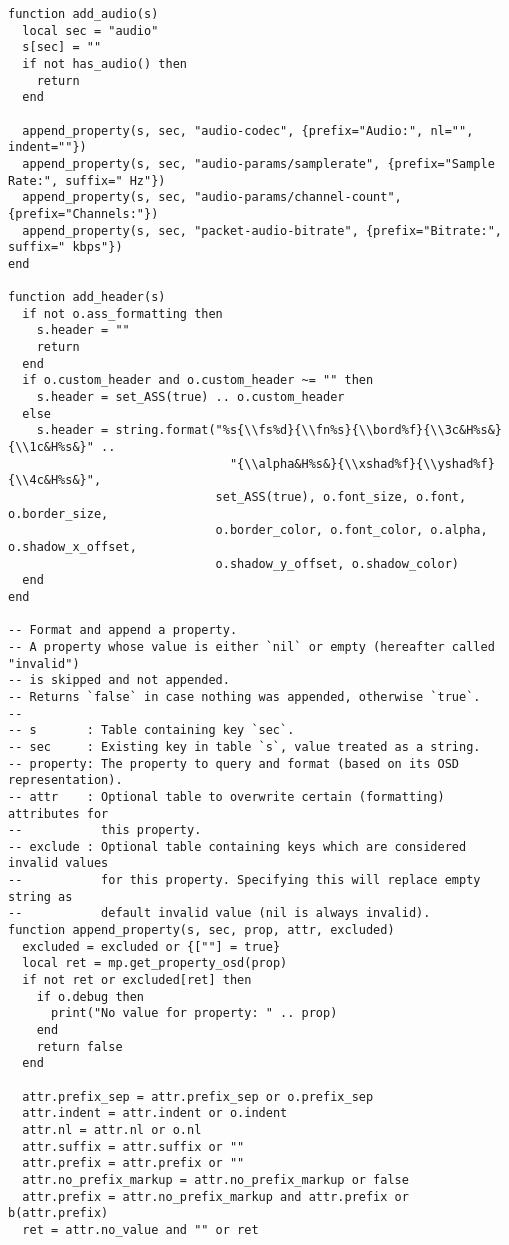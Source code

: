 \documentclass[11pt]{article}
\begin{document}
\begin{lstlisting}
function add_audio(s)
  local sec = "audio"
  s[sec] = ""
  if not has_audio() then
    return
  end

  append_property(s, sec, "audio-codec", {prefix="Audio:", nl="", indent=""})
  append_property(s, sec, "audio-params/samplerate", {prefix="Sample Rate:", suffix=" Hz"})
  append_property(s, sec, "audio-params/channel-count", {prefix="Channels:"})
  append_property(s, sec, "packet-audio-bitrate", {prefix="Bitrate:", suffix=" kbps"})
end

function add_header(s)
  if not o.ass_formatting then
    s.header = ""
    return
  end
  if o.custom_header and o.custom_header ~= "" then
    s.header = set_ASS(true) .. o.custom_header
  else
    s.header = string.format("%s{\\fs%d}{\\fn%s}{\\bord%f}{\\3c&H%s&}{\\1c&H%s&}" ..
                               "{\\alpha&H%s&}{\\xshad%f}{\\yshad%f}{\\4c&H%s&}",
                             set_ASS(true), o.font_size, o.font, o.border_size,
                             o.border_color, o.font_color, o.alpha, o.shadow_x_offset,
                             o.shadow_y_offset, o.shadow_color)
  end
end

-- Format and append a property.
-- A property whose value is either `nil` or empty (hereafter called "invalid")
-- is skipped and not appended.
-- Returns `false` in case nothing was appended, otherwise `true`.
--
-- s       : Table containing key `sec`.
-- sec     : Existing key in table `s`, value treated as a string.
-- property: The property to query and format (based on its OSD representation).
-- attr    : Optional table to overwrite certain (formatting) attributes for
--           this property.
-- exclude : Optional table containing keys which are considered invalid values
--           for this property. Specifying this will replace empty string as
--           default invalid value (nil is always invalid).
function append_property(s, sec, prop, attr, excluded)
  excluded = excluded or {[""] = true}
  local ret = mp.get_property_osd(prop)
  if not ret or excluded[ret] then
    if o.debug then
      print("No value for property: " .. prop)
    end
    return false
  end

  attr.prefix_sep = attr.prefix_sep or o.prefix_sep
  attr.indent = attr.indent or o.indent
  attr.nl = attr.nl or o.nl
  attr.suffix = attr.suffix or ""
  attr.prefix = attr.prefix or ""
  attr.no_prefix_markup = attr.no_prefix_markup or false
  attr.prefix = attr.no_prefix_markup and attr.prefix or b(attr.prefix)
  ret = attr.no_value and "" or ret


\end{lstlisting}
\end{document}
